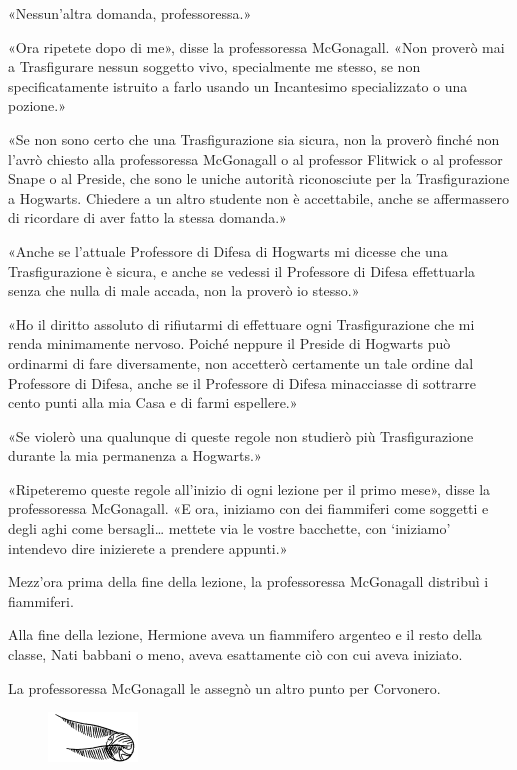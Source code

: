 «Nessun’altra domanda, professoressa.»

«Ora ripetete dopo di me», disse la professoressa McGonagall. «Non proverò mai a Trasfigurare nessun soggetto vivo, specialmente me stesso, se non specificatamente istruito a farlo usando un Incantesimo specializzato o una pozione.»

«Se non sono certo che una Trasfigurazione sia sicura, non la proverò finché non l’avrò chiesto alla professoressa McGonagall o al professor Flitwick o al professor Snape o al Preside, che sono le uniche autorità riconosciute per la Trasfigurazione a Hogwarts. Chiedere a un altro studente non è accettabile, anche se affermassero di ricordare di aver fatto la stessa domanda.»

«Anche se l’attuale Professore di Difesa di Hogwarts mi dicesse che una Trasfigurazione è sicura, e anche se vedessi il Professore di Difesa effettuarla senza che nulla di male accada, non la proverò io stesso.»

«Ho il diritto assoluto di rifiutarmi di effettuare ogni Trasfigurazione che mi renda minimamente nervoso. Poiché neppure il Preside di Hogwarts può ordinarmi di fare diversamente, non accetterò certamente un tale ordine dal Professore di Difesa, anche se il Professore di Difesa minacciasse di sottrarre cento punti alla mia Casa e di farmi espellere.»

«Se violerò una qualunque di queste regole non studierò più Trasfigurazione durante la mia permanenza a Hogwarts.»

«Ripeteremo queste regole all’inizio di ogni lezione per il primo mese», disse la professoressa McGonagall. «E ora, iniziamo con dei fiammiferi come soggetti e degli aghi come bersagli… mettete via le vostre bacchette, con ‘iniziamo’ intendevo dire inizierete a prendere appunti.»

Mezz’ora prima della fine della lezione, la professoressa McGonagall distribuì i fiammiferi.

Alla fine della lezione, Hermione aveva un fiammifero argenteo e il resto della classe, Nati babbani o meno, aveva esattamente ciò con cui aveva iniziato.

La professoressa McGonagall le assegnò un altro punto per Corvonero.

\begin{figure}[h!]
        \includegraphics[scale=0.4]{boccino.png}
        \centering
\end{figure}

